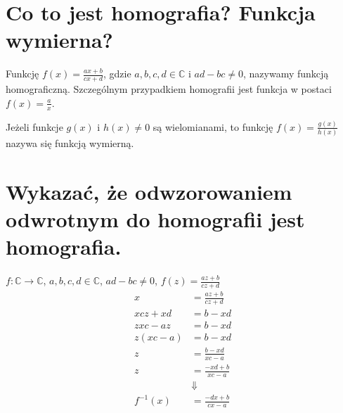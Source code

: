 \documentclass{article}
\numberwithin{equation}{section}
\theoremstyle{definition}
\theoremstyle{case}
\renewcommand*{\C}{\mathbb{C}}
\DeclareMathOperator{\tg}{tg}
\DeclareMathOperator{\ctg}{ctg}
\begin{document}
\begin{multicols}{2}
\end{multicols}

\section{Co to jest homografia? Funkcja wymierna?}
Funkcję $f(x) = \frac{ax+b}{cx+d}$, gdzie $a,b,c,d \in \C$ i $ad-bc \neq 0$, nazywamy funkcją homograficzną. Szczególnym przypadkiem homografii jest funkcja w postaci $f(x) = \frac{a}{x}$.

Jeżeli funkcje $g(x)$ i $h(x) \neq 0$ są wielomianami, to funkcję $f(x)=\frac{g(x)}{h(x)}$ nazywa się funkcją wymierną.

\section{Wykazać, że odwzorowaniem odwrotnym do homografii jest homografia.}
$f \colon \C \to \C$, $a,b,c,d \in \C$, $ad-bc \neq 0$, $f(z) = \frac{az+b}{cz+d}$
\begin{align*}
	x &= \frac{az+b}{cz+d}
	\\ xcz+xd &= b-xd
	\\ zxc-az &= b-xd
	\\ z(xc-a) &= b-xd
	\\ z &= \frac{b-xd}{xc-a}
	\\ z &= \frac{-xd+b}{xc-a}
	\\ &\Downarrow
	\\ f^{-1}(x) &= \frac{-dx+b}{cx-a}
\end{align*}
\end{document}
